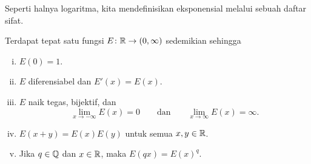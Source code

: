 Seperti halnya logaritma, kita mendefinisikan eksponensial melalui sebuah daftar
sifat.

\begin{prop}
Terdapat tepat satu fungsi $E \colon {\mathbb{R}} \to (0,\infty)$ sedemikian sehingga
\begin{enumerate}[(i)]
\item \label{it:exp:i}
$E(0) = 1$.
\item \label{it:exp:ii}
$E$ diferensiabel dan $E'(x) = E(x)$.
\item \label{it:exp:iii}
$E$ naik tegas, bijektif, dan
\begin{equation*}
\lim_{x\to -\infty} E(x) = 0 \qquad \text{dan} \qquad
\lim_{x\to \infty} E(x) = \infty .
\end{equation*}
\item \label{it:exp:iv}
$E(x+y) = E(x)E(y)$ untuk semua $x,y \in {\mathbb{R}}$.
\item \label{it:exp:v}
Jika $q \in {\mathbb{Q}}$ dan $x \in {\mathbb{R}}$, maka
$E(qx) = {E(x)}^q$.
\end{enumerate}
\end{prop}

